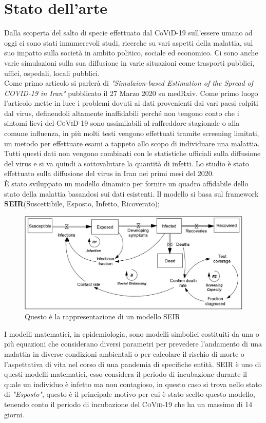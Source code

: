 \documentclass[12pt, openany]{book}
\begin{document}
	\chapter{Stato dell'arte}
		Dalla scoperta del salto di specie effettuato dal CoViD-19 sull'essere umano ad oggi ci sono stati innumerevoli studi, ricerche su vari aspetti della malattia, sul suo impatto sulla società in ambito politico, sociale ed economico. Ci sono anche varie simulazioni sulla sua diffusione in varie situazioni come trasporti pubblici, uffici, ospedali, locali pubblici. \\
		Come primo articolo si parlerà di \emph{"Simulaion-based Estimation of the Spread of COVID-19 in Iran"} \cite{Iran} pubblicato il 27 Marzo 2020 su medRxiv. Come primo luogo l'articolo mette in luce i problemi dovuti ai dati provenienti dai vari paesi colpiti dal virus, definendoli altamente inaffidabili perché non tengono conto che i sintomi lievi del \textsc{CoViD-19} sono assimilabili al raffreddore stagionale o alla comune influenza, in più molti testi vengono effettuati tramite screening limitati, un metodo per effettuare esami a tappeto allo scopo di individuare una malattia. Tutti questi dati non vengono combinati con le statistiche ufficiali sulla diffusione del virus e si va quindi a sottovalutare la quantità di infetti.
		Lo studio è stato effettuato sulla diffusione del virus in Iran nei primi mesi del 2020.\\
		È stato sviluppato un modello dinamico per fornire un quadro affidabile dello stato della malattia basandosi sui dati esistenti. Il modello si basa sul framework \textbf{SEIR}(Suscettibile, Esposto, Infetto, Ricoverato); 
		\begin{figure}[H]
			\centering
			\includegraphics[width=1\linewidth]{"Immagini/SEIR"}
			\caption{Questo è la rappresentazione di un modello SEIR }
			\label{fig:SEIR}
		\end{figure}
		I modelli matematici, in epidemiologia, sono modelli simbolici costituiti da una o più equazioni che considerano diversi parametri per prevedere l'andamento di una malattia in diverse condizioni ambientali o per calcolare il rischio di morte o l'aspettativa di vita nel corso di una pandemia di specifiche entità. SEIR è uno di questi modelli matematici, esso considera il periodo di incubazione durante il quale un individuo è infetto ma non contagioso, in questo caso si trova nello stato di \emph{"Esposto"}, questo è il principale motivo per cui è stato scelto questo modello, tenendo conto il periodo di incubazione del \textsc{CoVid-19} che ha un massimo di 14 giorni.\\
\end{document}
